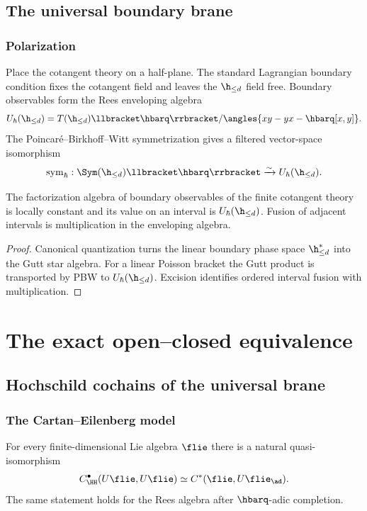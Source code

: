\chapter{The universal boundary brane}
\section{Polarization}
Place the cotangent theory on a half-plane.  The standard Lagrangian boundary condition fixes the cotangent field and leaves the $\h_{\le d}$ field free.  Boundary observables form the Rees enveloping algebra
\[
 U_\hbar(\h_{\le d})
 =T(\h_{\le d})\llbracket\hbarq\rrbracket/
 \angles{xy-yx-\hbarq[x,y]}.
\]
The Poincar\'e--Birkhoff--Witt symmetrization gives a filtered vector-space isomorphism
\[
 \operatorname{sym}_\hbar:\Sym(\h_{\le d})\llbracket\hbarq\rrbracket
 \xrightarrow{\sim}U_\hbar(\h_{\le d}).
\]

\begin{theorem}
The factorization algebra of boundary observables of the finite cotangent theory is locally constant and its value on an interval is $U_\hbar(\h_{\le d})$.  Fusion of adjacent intervals is multiplication in the enveloping algebra.
\end{theorem}
\begin{proof}
Canonical quantization turns the linear boundary phase space $\h_{\le d}^*$ into the Gutt star algebra.  For a linear Poisson bracket the Gutt product is transported by PBW to $U_\hbar(\h_{\le d})$.  Excision identifies ordered interval fusion with multiplication.
\end{proof}

\part{The exact open--closed equivalence}

\chapter{Hochschild cochains of the universal brane}
\section{The Cartan--Eilenberg model}
For every finite-dimensional Lie algebra $\flie$ there is a natural quasi-isomorphism
\[
 C^\bullet_{\HH}(U\flie,U\flie)
 \simeq C^*(\flie,U\flie_{\ad}).
\]
The same statement holds for the Rees algebra after $\hbarq$-adic completion.

